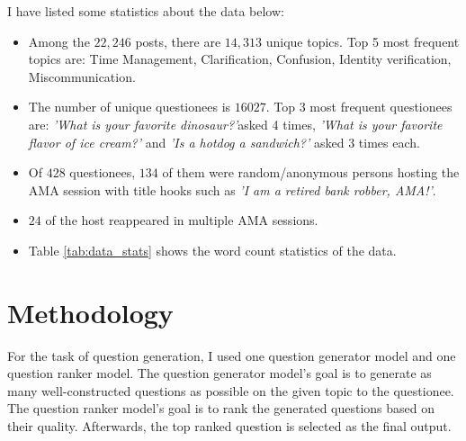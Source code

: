 \documentclass[paper=a4, fontsize=11pt]{scrartcl}
\numberwithin{equation}{section}		%
\numberwithin{figure}{section}			%
\numberwithin{table}{section}				%
\begin{document}
I have listed some statistics about the data below:
\begin{itemize}
  \item Among the $22,246$ posts, there are $14,313$ unique topics. Top 5 most frequent topics are: Time Management, Clarification, Confusion, Identity verification, Miscommunication.
  \item The number of unique questionees is $16027$. Top 3 most frequent questionees are: \textit{'What is your favorite dinosaur?'}asked 4 times, \textit{'What is your favorite flavor of ice cream?'} and \textit{'Is a hotdog a sandwich?'} asked 3 times each.
  \item Of $428$ questionees, $134$ of them were random/anonymous persons hosting the AMA session with title hooks such as \textit{'I am a retired bank robber, AMA!'}.
  \item $24$ of the host reappeared in multiple AMA sessions.
  \item Table \ref{tab:data_stats} shows the word count statistics of the data.
\end{itemize}

\section{Methodology}
For the task of question generation, I used one question generator model and one question ranker model. 
The question generator model's goal is to generate as many well-constructed questions as possible on the given topic to the questionee.
The question ranker model's goal is to rank the generated questions based on their quality.
Afterwards, the top ranked question is selected as the final output.
\end{document}
